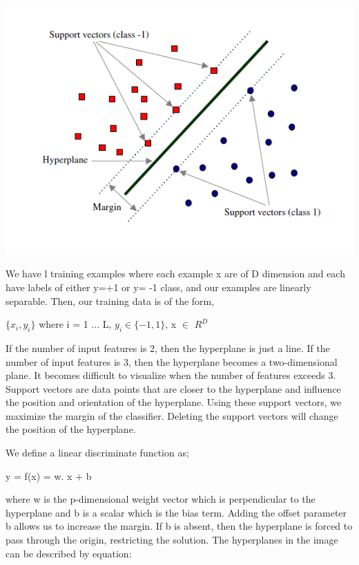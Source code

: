 \documentclass{article}
\begin{document}
	\begin{center}
	    \includegraphics[scale = 0.7]{images/hyperplane.png}
	\end{center}
\par
	We have l training examples where each example x are of D dimension and each have labels of either y=+1 or y= -1 class, and our examples are linearly separable. Then, our training data is of the form,
	\begin{center}
	    $\{x_i,y_i\}$ where i = 1 ... L, $y_i \in \{-1,1\}$, x $\in$ $R^D$ 
	\end{center}
\par
	If the number of input features is 2, then the hyperplane is just a line. If the number of input features is 3, then the hyperplane becomes a two-dimensional plane. It becomes difficult to visualize when the number of features exceeds 3.
	Support vectors are data points that are closer to the hyperplane and influence the position and orientation of the hyperplane. Using these support vectors, we maximize the margin of the classifier. Deleting the support vectors will change the position of the hyperplane. 
\par
	We define a linear discriminate function as;
	\begin{center}
	y = f(x) = w. x + b     
	\end{center}
	where w is the p-dimensional weight vector which is perpendicular to the hyperplane and b is a scalar which is the bias term.  Adding the offset parameter b allows us to increase the margin. If b is absent, then
	the hyperplane is forced to pass through the origin, restricting the solution. 
	The hyperplanes in the image can be described by equation: 
\end{document}
